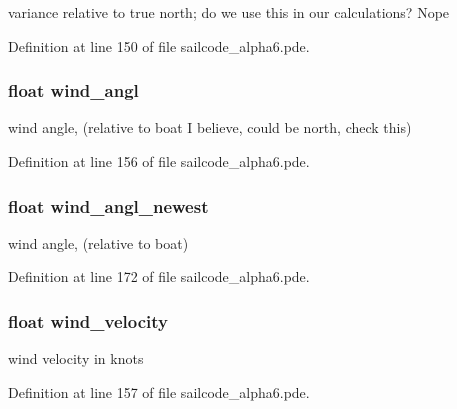 variance relative to true north; do we use this in our calculations? \-Nope 



\-Definition at line 150 of file sailcode\-\_\-alpha6.\-pde.

\hypertarget{group__group1_ga6bc5259b7cc1cb6128495b28f55b0a5d}{
\subsubsection[{wind\-\_\-angl}]{\setlength{\rightskip}{0pt plus 5cm}float {\bf wind\-\_\-angl}}}
\label{group__group1_ga6bc5259b7cc1cb6128495b28f55b0a5d}


wind angle, (relative to boat \-I believe, could be north, check this) 



\-Definition at line 156 of file sailcode\-\_\-alpha6.\-pde.

\hypertarget{group__group1_ga9fcee93bab7f0c81f67b99f8b8597e9c}{
\subsubsection[{wind\-\_\-angl\-\_\-newest}]{\setlength{\rightskip}{0pt plus 5cm}float {\bf wind\-\_\-angl\-\_\-newest}}}
\label{group__group1_ga9fcee93bab7f0c81f67b99f8b8597e9c}


wind angle, (relative to boat) 



\-Definition at line 172 of file sailcode\-\_\-alpha6.\-pde.

\hypertarget{group__group1_ga641fd5e4834deb5465b1931b7645457d}{
\subsubsection[{wind\-\_\-velocity}]{\setlength{\rightskip}{0pt plus 5cm}float {\bf wind\-\_\-velocity}}}
\label{group__group1_ga641fd5e4834deb5465b1931b7645457d}


wind velocity in knots 



\-Definition at line 157 of file sailcode\-\_\-alpha6.\-pde.

